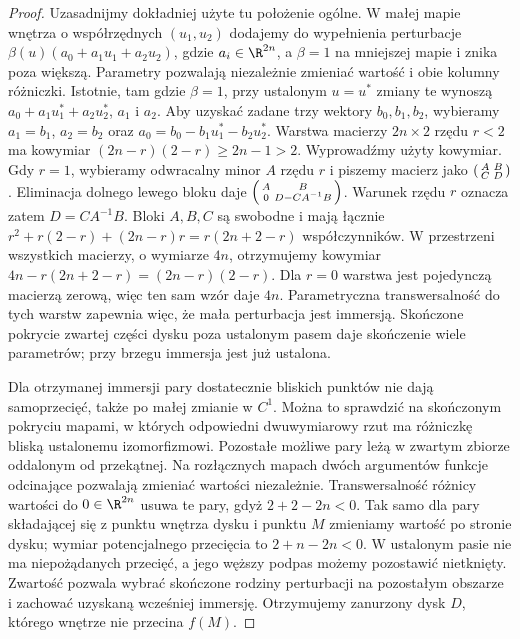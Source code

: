 \begin{proof}
Uzasadnijmy dokładniej użyte tu położenie ogólne.
W małej mapie wnętrza o współrzędnych $(u_1,u_2)$
dodajemy do wypełnienia perturbacje
$\beta(u)(a_0+a_1u_1+a_2u_2)$, gdzie $a_i\in\R^{2n}$,
a $\beta=1$ na mniejszej mapie i znika poza większą.
Parametry pozwalają niezależnie zmieniać wartość
i obie kolumny różniczki.
Istotnie, tam gdzie $\beta=1$, przy ustalonym $u=u^*$
zmiany te wynoszą
$a_0+a_1u_1^*+a_2u_2^*$, $a_1$ i $a_2$.
Aby uzyskać zadane trzy wektory $b_0,b_1,b_2$,
wybieramy $a_1=b_1$, $a_2=b_2$ oraz
$a_0=b_0-b_1u_1^*-b_2u_2^*$.
Warstwa macierzy
$2n\times2$ rzędu $r<2$ ma kowymiar
$(2n-r)(2-r)\geq2n-1>2$.
Wyprowadźmy użyty kowymiar. Gdy $r=1$,
wybieramy odwracalny minor $A$ rzędu $r$
i piszemy macierz jako
$\begin{psmallmatrix}A&B\\ C&D\end{psmallmatrix}$.
Eliminacja dolnego lewego bloku daje
$\begin{psmallmatrix}A&B\\0&D-CA^{-1}B\end{psmallmatrix}$.
Warunek rzędu $r$ oznacza zatem $D=CA^{-1}B$.
Bloki $A,B,C$ są swobodne i mają łącznie
$r^2+r(2-r)+(2n-r)r=r(2n+2-r)$ współczynników.
W przestrzeni wszystkich macierzy, o wymiarze $4n$,
otrzymujemy kowymiar
$4n-r(2n+2-r)=(2n-r)(2-r)$.
Dla $r=0$ warstwa jest pojedynczą macierzą zerową,
więc ten sam wzór daje $4n$.
Parametryczna transwersalność
do tych warstw zapewnia więc, że mała perturbacja
jest immersją. Skończone pokrycie zwartej części
dysku poza ustalonym pasem daje skończenie wiele
parametrów; przy brzegu immersja jest już ustalona.

Dla otrzymanej immersji pary dostatecznie bliskich
punktów nie dają samoprzecięć, także po małej zmianie
w $C^1$. Można to sprawdzić na skończonym pokryciu
mapami, w których odpowiedni dwuwymiarowy rzut ma
różniczkę bliską ustalonemu izomorfizmowi.
Pozostałe możliwe pary leżą w zwartym zbiorze
oddalonym od przekątnej. Na rozłącznych mapach
dwóch argumentów funkcje odcinające pozwalają
zmieniać wartości niezależnie. Transwersalność
różnicy wartości do $0\in\R^{2n}$ usuwa te pary,
gdyż $2+2-2n<0$. Tak samo dla pary składającej się
z punktu wnętrza dysku i punktu $M$ zmieniamy
wartość po stronie dysku; wymiar potencjalnego
przecięcia to $2+n-2n<0$. W ustalonym pasie nie
ma niepożądanych przecięć, a jego węższy podpas
możemy pozostawić nietknięty. Zwartość pozwala
wybrać skończone rodziny perturbacji na pozostałym
obszarze i zachować uzyskaną wcześniej immersję.
Otrzymujemy zanurzony dysk $D$, którego wnętrze
nie przecina $f(M)$.


\end{proof}
